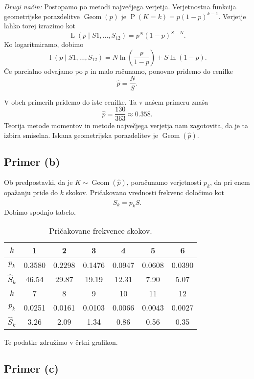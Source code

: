 \documentclass[a4paper,11pt]{article}
\DeclareMathOperator{\PP}{P}
\DeclareMathOperator{\Geom}{Geom}
\DeclareMathOperator{\Lver}{L}
\DeclareMathOperator{\lver}{l}
\begin{document}
\emph{Drugi način:} Postopamo po metodi največjega verjetja.
Verjetnostna funkcija geometrijske porazdelitve $\Geom(p)$ je $\PP(K=k) = p(1-p)^{k-1}$.
Verjetje lahko torej izrazimo kot 
\[\Lver(p \mid S1, \ldots, S_{12}) = p^N (1-p)^{S - N}.\]
Ko logaritmiramo, dobimo 
\[\lver(p \mid S1, \ldots, S_{12}) = N \ln(\frac{p}{1-p}) + S \ln(1-p).\]
Če parcialno odvajamo po $p$ in malo računamo, ponovno pridemo do cenilke
\[\hat{p} = \frac{N}{S}.\]

V obeh primerih pridemo do iste cenilke.
Ta v našem primeru znaša 
\[\hat{p} = \frac{130}{363} \approx 0.358.\]
Teorija metode momentov in metode največjega verjetja nam zagotovita, da je ta izbira smiselna.
Iskana geometrijska porazdelitev je $\Geom(\hat{p})$.

\subsection{Primer (b)}

Ob predpostavki, da je $K \sim \Geom(\hat{p})$, poračunamo verjetnosti $p_k$, da pri enem opažanju pride do $k$ skokov.
Pričakovano vrednosti frekvenc določimo kot
\[\hat{S}_k = p_kS.\]
Dobimo spodnjo tabelo.
\begin{table}[h]
    \centering
    \begin{tabular}{|c|c|c|c|c|c|c|}
    \hline
    $k$ & 1 & 2 & 3 & 4 & 5 & 6 \\ \hline
    $p_k$ & 0.3580 & 0.2298 & 0.1476 & 0.0947 & 0.0608 & 0.0390  \\ \hline
    $\hat{S}_k$ & 46.54 & 29.87 & 19.19 & 12.31 & 7.90 & 5.07 \\ \hline
    $k$ & 7 & 8 & 9 & 10 & 11 & 12 \\ \hline
    $p_k$ & 0.0251 & 0.0161 & 0.0103 & 0.0066 & 0.0043 & 0.0027 \\ \hline
    $\hat{S}_k$ & 3.26 & 2.09 & 1.34 & 0.86 & 0.56 & 0.35 \\ \hline
\end{tabular}
\caption{Pričakovane frekvence skokov.}
\label{PricakovaneFreq}
\end{table}

Te podatke združimo v črtni grafikon.


\subsection{Primer (c)}








\end{document}
